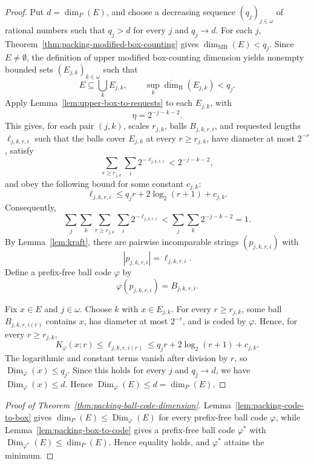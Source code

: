 \documentclass[a4paper,oneside,reqno,12pt]{amsart}
\theoremstyle{plain}
\theoremstyle{definition}
\theoremstyle{remark}
\DeclareMathOperator{\Dim}{Dim}
\begin{document}
\begin{proof}
Put \(d=\dim_P(E)\), and choose a decreasing sequence
\((q_j)_{j\in\omega}\) of rational numbers such that \(q_j>d\) for every \(j\)
and \(q_j\to d\).  For each \(j\),
Theorem~\ref{thm:packing-modified-box-counting} gives
\(\overline{\dim}_{\mathrm{MB}}(E)<q_j\).  Since \(E\ne\emptyset\), the definition
of upper modified box-counting dimension yields nonempty bounded sets
\((E_{j,k})_{k\in\omega}\) such that
\[
E\subseteq\bigcup_kE_{j,k},
\qquad
\sup_k\overline{\dim}_{\mathrm B}(E_{j,k})<q_j.
\]
Apply Lemma~\ref{lem:upper-box-to-requests} to each \(E_{j,k}\), with
\[
\eta=2^{-j-k-2}.
\]
This gives, for each pair \((j,k)\), scales \(r_{j,k}\), balls \(B_{j,k,r,i}\),
and requested lengths \(\ell_{j,k,r,i}\) such that the balls cover \(E_{j,k}\) at
every \(r\ge r_{j,k}\), have diameter at most \(2^{-r}\), satisfy
\[
\sum_{r\ge r_{j,k}}\sum_i2^{-\ell_{j,k,r,i}}
<2^{-j-k-2},
\]
and obey the following bound for some constant \(c_{j,k}\):
\[
\ell_{j,k,r,i}\le q_jr+2\log_2(r+1)+c_{j,k}.
\]
Consequently,
\[
\sum_j\sum_k\sum_{r\ge r_{j,k}}\sum_i
2^{-\ell_{j,k,r,i}}
<
\sum_j\sum_k2^{-j-k-2}
=1.
\]
By Lemma~\ref{lem:kraft}, there are pairwise incomparable strings
\((p_{j,k,r,i})\) with
\[
|p_{j,k,r,i}|=\ell_{j,k,r,i}.
\]
Define a prefix-free ball code \(\varphi\) by
\[
\varphi(p_{j,k,r,i})=B_{j,k,r,i}.
\]

Fix \(x\in E\) and \(j\in\omega\).  Choose \(k\) with \(x\in E_{j,k}\).  For every
\(r\ge r_{j,k}\), some ball \(B_{j,k,r,i(r)}\) contains \(x\), has diameter at
most \(2^{-r}\), and is coded by \(\varphi\).  Hence, for every \(r\ge r_{j,k}\),
\[
K_\varphi(x;r)
\le
\ell_{j,k,r,i(r)}
\le q_jr+2\log_2(r+1)+c_{j,k}.
\]
The logarithmic and constant terms vanish after division by \(r\), so
\(\Dim_\varphi(x)\le q_j\).  Since this holds for every \(j\) and \(q_j\to d\),
we have \(\Dim_\varphi(x)\le d\).  Hence
\(\Dim_\varphi(E)\le d=\dim_P(E)\).
\end{proof}


\begin{proof}[Proof of Theorem~\ref{thm:packing-ball-code-dimension}]
Lemma~\ref{lem:packing-code-to-box} gives
\(\dim_P(E)\le\Dim_\varphi(E)\) for every prefix-free ball code \(\varphi\), while
Lemma~\ref{lem:packing-box-to-code} gives a prefix-free ball code \(\varphi^*\)
with \(\Dim_{\varphi^*}(E)\le\dim_P(E)\).  Hence equality holds, and
\(\varphi^*\) attains the minimum.
\end{proof}
\end{document}
